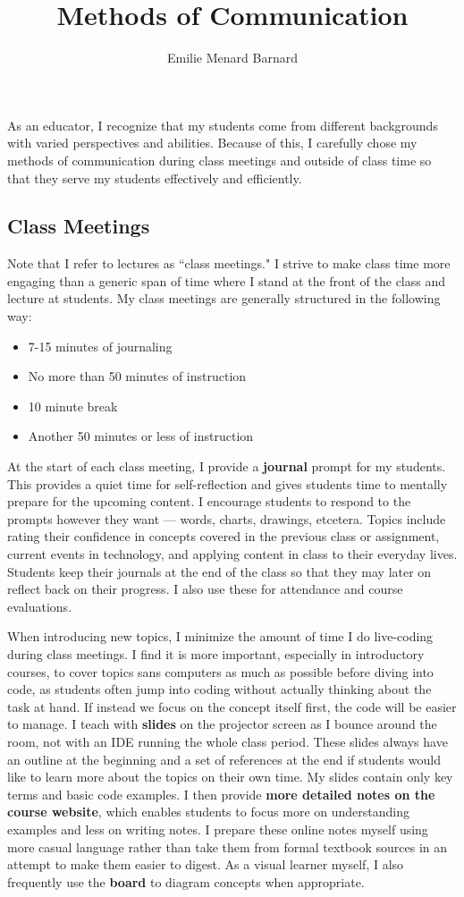 \documentclass[12pt]{amsart} \usepackage{amssymb}
\title[]{Methods of Communication}
\author[]{Emilie Menard Barnard}
\begin{document}
\maketitle
\thispagestyle{empty}

As an educator, I recognize that my students come from different backgrounds with varied perspectives and abilities. Because of this, I carefully chose my methods of communication during class meetings and outside of class time so that they serve my students effectively and efficiently.

\subsection*{Class Meetings}
Note that I refer to lectures as ``class meetings." I strive to make class time more engaging than a generic span of time where I stand at the front of the class and lecture at students. My class meetings are generally structured in the following way: 
\begin{itemize}
\item 7-15 minutes of journaling
\item No more than 50 minutes of instruction
\item 10 minute break
\item Another 50 minutes or less of instruction
\end{itemize}

At the start of each class meeting, I provide a \textbf{journal} prompt for my students. This provides a quiet time for self-reflection and gives students time to mentally prepare for the upcoming content. I encourage students to respond to the prompts however they want --- words, charts, drawings, etcetera. Topics include rating their confidence in concepts covered in the previous class or assignment, current events in technology, and applying content in class to their everyday lives. Students keep their journals at the end of the class so that they may later on reflect back on their progress. I also use these for attendance and course evaluations.

When introducing new topics, I minimize the amount of time I do live-coding during class meetings. I find it is more important, especially in introductory courses, to cover topics sans computers as much as possible before diving into code, as students often jump into coding without actually thinking about the task at hand. If instead we focus on the concept itself first, the code will be easier to manage. I teach with \textbf{slides} on the projector screen as I bounce around the room, not with an IDE running the whole class period. These slides always have an outline at the beginning and a set of references at the end if students would like to learn more about the topics on their own time. My slides contain only key terms and basic code examples. I then provide \textbf{more detailed notes on the course website}, which enables students to focus more on understanding examples and less on writing notes. I prepare these online notes myself using more casual language rather than take them from formal textbook sources in an attempt to make them easier to digest. As a visual learner myself, I also frequently use the \textbf{board} to diagram concepts when appropriate.
\end{document}
